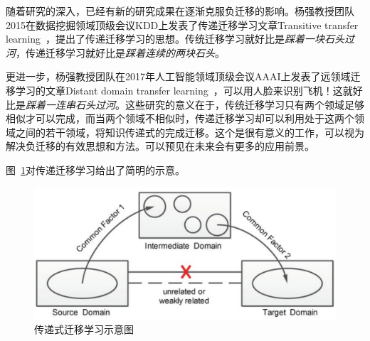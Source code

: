 随着研究的深入，已经有新的研究成果在逐渐克服负迁移的影响。杨强教授团队2015在数据挖掘领域顶级会议KDD上发表了传递迁移学习文章Transitive transfer learning~\cite{tan2015transitive}，提出了传递迁移学习的思想。传统迁移学习就好比是\textit{踩着一块石头过河}，传递迁移学习就好比是\textit{踩着连续的两块石头}。

更进一步，杨强教授团队在2017年人工智能领域顶级会议AAAI上发表了远领域迁移学习的文章Distant domain transfer learning~\cite{tan2017distant}，可以用人脸来识别飞机！这就好比是\textit{踩着一连串石头过河}。这些研究的意义在于，传统迁移学习只有两个领域足够相似才可以完成，而当两个领域不相似时，传递迁移学习却可以利用处于这两个领域之间的若干领域，将知识传递式的完成迁移。这个是很有意义的工作，可以视为解决负迁移的有效思想和方法。可以预见在未来会有更多的应用前景。

图~\ref{fig-negative}对传递迁移学习给出了简明的示意。

\begin{figure}[htbp]
	\centering
	\includegraphics[scale=0.45]{./figures/fig-introduction-negativetransfer.pdf}
	\caption{传递式迁移学习示意图}
	\label{fig-negative}
\end{figure}

